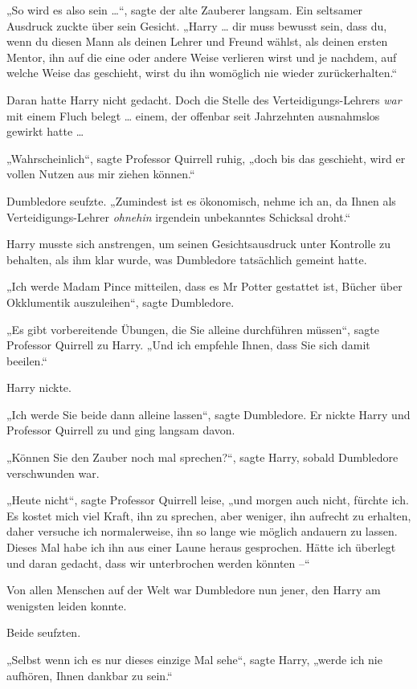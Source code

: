 {„So wird es also sein …“, sagte der alte Zauberer langsam. Ein seltsamer Ausdruck zuckte über sein Gesicht. „Harry … dir muss bewusst sein, dass du, wenn du diesen Mann als deinen Lehrer und Freund wählst, als deinen ersten Mentor, ihn auf die eine oder andere Weise verlieren wirst und je nachdem, auf welche Weise das geschieht, wirst du ihn womöglich nie wieder zurückerhalten.“

Daran hatte Harry nicht gedacht. Doch die Stelle des Verteidigungs-Lehrers \emph{war} mit einem Fluch belegt … einem, der offenbar seit Jahrzehnten ausnahmslos gewirkt hatte …

„Wahrscheinlich“, sagte Professor Quirrell ruhig, „doch bis das geschieht, wird er vollen Nutzen aus mir ziehen können.“

Dumbledore seufzte. „Zumindest ist es ökonomisch, nehme ich an, da Ihnen als Verteidigungs-Lehrer \emph{ohnehin} irgendein unbekanntes Schicksal droht.“

Harry musste sich anstrengen, um seinen Gesichtsausdruck unter Kontrolle zu behalten, als ihm klar wurde, was Dumbledore tatsächlich gemeint hatte.

„Ich werde Madam Pince mitteilen, dass es Mr Potter gestattet ist, Bücher über Okklumentik auszuleihen“, sagte Dumbledore.

„Es gibt vorbereitende Übungen, die Sie alleine durchführen müssen“, sagte Professor Quirrell zu Harry. „Und ich empfehle Ihnen, dass Sie sich damit beeilen.“

Harry nickte.

„Ich werde Sie beide dann alleine lassen“, sagte Dumbledore. Er nickte Harry und Professor Quirrell zu und ging langsam davon.

„Können Sie den Zauber noch mal sprechen?“, sagte Harry, sobald Dumbledore verschwunden war.

„Heute nicht“, sagte Professor Quirrell leise, „und morgen auch nicht, fürchte ich. Es kostet mich viel Kraft, ihn zu sprechen, aber weniger, ihn aufrecht zu erhalten, daher versuche ich normalerweise, ihn so lange wie möglich andauern zu lassen. Dieses Mal habe ich ihn aus einer Laune heraus gesprochen. Hätte ich überlegt und daran gedacht, dass wir unterbrochen werden könnten --“

Von allen Menschen auf der Welt war Dumbledore nun jener, den Harry am wenigsten leiden konnte.

Beide seufzten.

„Selbst wenn ich es nur dieses einzige Mal sehe“, sagte Harry, „werde ich nie aufhören, Ihnen dankbar zu sein.“

}

